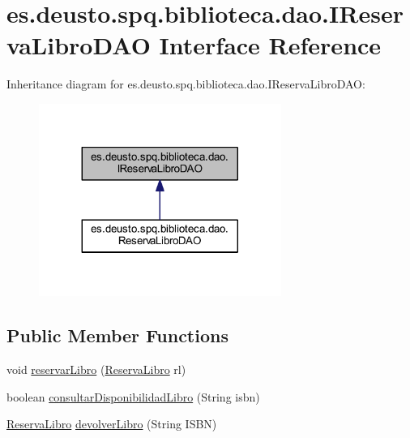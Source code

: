 \hypertarget{interfacees_1_1deusto_1_1spq_1_1biblioteca_1_1dao_1_1_i_reserva_libro_d_a_o}{}\section{es.\+deusto.\+spq.\+biblioteca.\+dao.\+I\+Reserva\+Libro\+D\+AO Interface Reference}
\label{interfacees_1_1deusto_1_1spq_1_1biblioteca_1_1dao_1_1_i_reserva_libro_d_a_o}


Inheritance diagram for es.\+deusto.\+spq.\+biblioteca.\+dao.\+I\+Reserva\+Libro\+D\+AO\+:
\nopagebreak
\begin{figure}[H]
\begin{center}
\leavevmode
\includegraphics[width=224pt]{interfacees_1_1deusto_1_1spq_1_1biblioteca_1_1dao_1_1_i_reserva_libro_d_a_o__inherit__graph}
\end{center}
\end{figure}
\subsection*{Public Member Functions}
\begin{DoxyCompactItemize}
\item 
void \mbox{\hyperlink{interfacees_1_1deusto_1_1spq_1_1biblioteca_1_1dao_1_1_i_reserva_libro_d_a_o_a9cd1320b865754765042c3421a3bf1a0}{reservar\+Libro}} (\mbox{\hyperlink{classes_1_1deusto_1_1spq_1_1biblioteca_1_1data_1_1_reserva_libro}{Reserva\+Libro}} rl)
\item 
boolean \mbox{\hyperlink{interfacees_1_1deusto_1_1spq_1_1biblioteca_1_1dao_1_1_i_reserva_libro_d_a_o_a56903b304697f889b59fb782a4e61aaf}{consultar\+Disponibilidad\+Libro}} (String isbn)
\item 
\mbox{\hyperlink{classes_1_1deusto_1_1spq_1_1biblioteca_1_1data_1_1_reserva_libro}{Reserva\+Libro}} \mbox{\hyperlink{interfacees_1_1deusto_1_1spq_1_1biblioteca_1_1dao_1_1_i_reserva_libro_d_a_o_a3a772c69bb728d2e32b1767101a05efd}{devolver\+Libro}} (String I\+S\+BN)
\end{DoxyCompactItemize}


